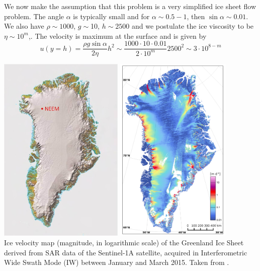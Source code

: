 We now make the assumption that this problem is a very simplified ice sheet flow problem.
The angle $\alpha$ is typically small and for $\alpha\sim 0.5-1$\degree, then $\sin\alpha\sim 0.01$. 
We also have $\rho\sim1000$, $g\sim$10,  $h\sim2500$ and we postulate the 
ice viscosity to be $\eta\sim 10^m$,.
The velocity is maximum at the surface and is given by
\begin{equation}
u(y=h)=
\frac{\rho g \sin \alpha}{2 \eta}h^2 
\sim \frac{1000 \cdot 10 \cdot 0.01}{ 2\cdot 10^m}2500^2
\sim 3\cdot 10^{8-m}
\label{eq:ice1}
\end{equation}

\begin{center}
\includegraphics[height=9cm]{python_codes/fieldstone_59/images/neem}
\includegraphics[height=9cm]{python_codes/fieldstone_59/images/narh15}\\
{\captionfont Ice velocity map (magnitude, in logarithmic scale) of the Greenland Ice Sheet
derived from SAR data of the Sentinel-1A satellite, acquired in Interferometric Wide Swath
Mode (IW) between January and March 2015. Taken from \cite{narh15}.}
\end{center}

